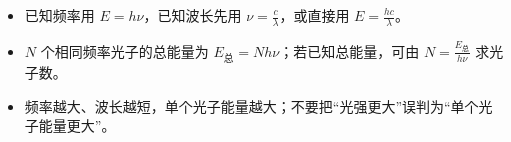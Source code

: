\begin{casetypebox}[title={\strut\textcolor{white}{\bfseries 常见题型：能量量子化计算}}]
\begin{itemize}[leftmargin=1.5em]
  \item 已知频率用 $E=h\nu$，已知波长先用 $\nu=\frac{c}{\lambda}$，或直接用 $E=\frac{hc}{\lambda}$。
  \item $N$ 个相同频率光子的总能量为 $E_{\text{总}}=Nh\nu$；若已知总能量，可由 $N=\frac{E_{\text{总}}}{h\nu}$ 求光子数。
  \item 频率越大、波长越短，单个光子能量越大；不要把“光强更大”误判为“单个光子能量更大”。
\end{itemize}
\end{casetypebox}
